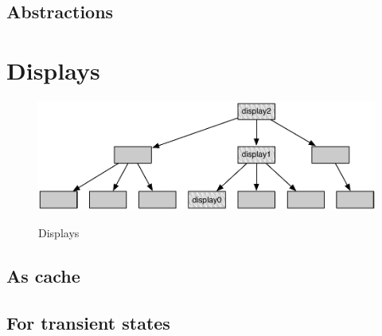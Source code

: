 
\subsection{Abstractions}



\section{Displays}

\begin{figure}[h!]
  \centering
  \includegraphics[width=\textwidth]{Figures/Displays}
  \label{Displays}
  \caption{Displays}
\end{figure}


\subsection{As cache}



\subsection{For transient states}

